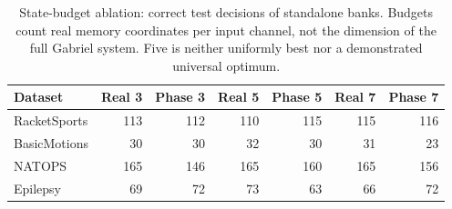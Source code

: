 \begin{table}[!htbp]
\centering\small
\begin{tabular}{lrrrrrr}
\toprule
Dataset & Real 3 & Phase 3 & Real 5 & Phase 5 & Real 7 & Phase 7 \\
\midrule
RacketSports & 113 & 112 & 110 & 115 & 115 & 116 \\
BasicMotions & 30 & 30 & 32 & 30 & 31 & 23 \\
NATOPS & 165 & 146 & 165 & 160 & 165 & 156 \\
Epilepsy & 69 & 72 & 73 & 63 & 66 & 72 \\
\bottomrule
\end{tabular}
\caption{State-budget ablation: correct test decisions of standalone banks. Budgets count real memory coordinates per input channel, not the dimension of the full Gabriel system. Five is neither uniformly best nor a demonstrated universal optimum.}
\label{tab:phase_budget}
\end{table}
